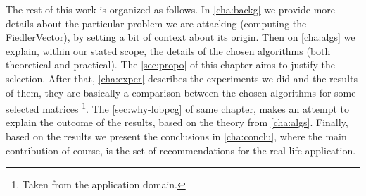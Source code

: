 The rest of this work is organized as follows. In \cref{cha:backg} we
provide more details about the particular problem we are attacking
(computing the \gls{FiedlerVector}), by setting a bit of context about
its origin. Then on \cref{cha:algs} we explain, within
our stated scope, the details of the chosen algorithms (both
theoretical and practical). The \cref{sec:propo} of this chapter aims
to justify the selection.  After that, \cref{cha:exper}
describes the experiments we did and the results of them, they are
basically a comparison between the chosen algorithms for some selected
matrices \footnote{Taken
  from the application domain.}. The \cref{sec:why-lobpcg} of same
chapter,  makes an attempt to explain the outcome of the results,
based on the theory from \cref{cha:algs}. Finally, based  
on the results we present the conclusions in \cref{cha:conclu}, where
the main contribution of course, is the set of recommendations for the
real-life application.

